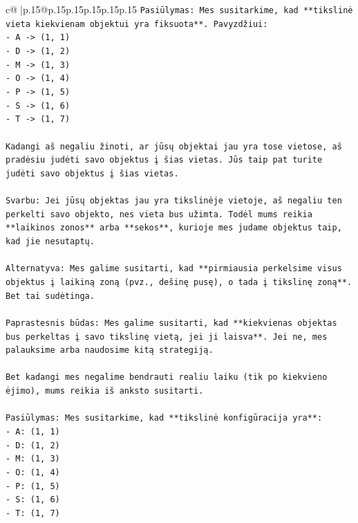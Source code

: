 \documentclass{article}
\begin{document}
{\begin{supertabular}{c@{$\;$}|p{.15\linewidth}@{}p{.15\linewidth}p{.15\linewidth}p{.15\linewidth}p{.15\linewidth}p{.15\linewidth}}
{{{\texttt{Pasiūlymas: Mes susitarkime, kad **tikslinė vieta kiekvienam objektui yra fiksuota**. Pavyzdžiui:} \\
\texttt{{-} A {-}> (1, 1)} \\
\texttt{{-} D {-}> (1, 2)} \\
\texttt{{-} M {-}> (1, 3)} \\
\texttt{{-} O {-}> (1, 4)} \\
\texttt{{-} P {-}> (1, 5)} \\
\texttt{{-} S {-}> (1, 6)} \\
\texttt{{-} T {-}> (1, 7)} \\
\\ 
\texttt{Kadangi aš negaliu žinoti, ar jūsų objektai jau yra tose vietose, aš pradėsiu judėti savo objektus į šias vietas. Jūs taip pat turite judėti savo objektus į šias vietas.} \\
\\ 
\texttt{Svarbu: Jei jūsų objektas jau yra tikslinėje vietoje, aš negaliu ten perkelti savo objekto, nes vieta bus užimta. Todėl mums reikia **laikinos zonos** arba **sekos**, kurioje mes judame objektus taip, kad jie nesutaptų.} \\
\\ 
\texttt{Alternatyva: Mes galime susitarti, kad **pirmiausia perkelsime visus objektus į laikiną zoną (pvz., dešinę pusę), o tada į tikslinę zoną**. Bet tai sudėtinga.} \\
\\ 
\texttt{Paprastesnis būdas: Mes galime susitarti, kad **kiekvienas objektas bus perkeltas į savo tikslinę vietą, jei ji laisva**. Jei ne, mes palauksime arba naudosime kitą strategiją.} \\
\\ 
\texttt{Bet kadangi mes negalime bendrauti realiu laiku (tik po kiekvieno ėjimo), mums reikia iš anksto susitarti.} \\
\\ 
\texttt{Pasiūlymas: Mes susitarkime, kad **tikslinė konfigūracija yra**:} \\
\texttt{{-} A: (1, 1)} \\
\texttt{{-} D: (1, 2)} \\
\texttt{{-} M: (1, 3)} \\
\texttt{{-} O: (1, 4)} \\
\texttt{{-} P: (1, 5)} \\
\texttt{{-} S: (1, 6)} \\
\texttt{{-} T: (1, 7)} \\
\\ 
}}}
\end{supertabular}}
\end{document}
